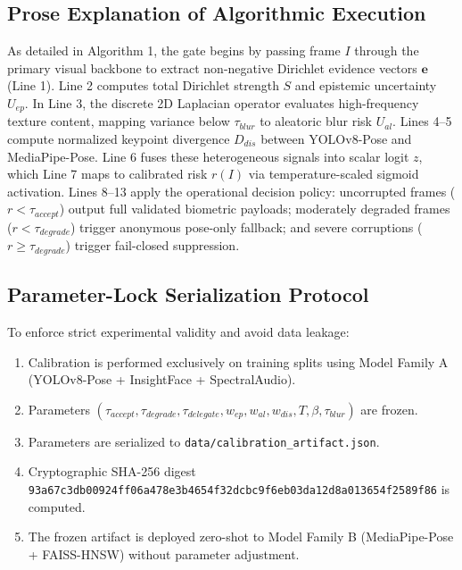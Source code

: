 \documentclass[conference]{IEEEtran}
\begin{document}
\subsection{Prose Explanation of Algorithmic Execution}
As detailed in Algorithm 1, the gate begins by passing frame $I$ through the primary visual backbone to extract non-negative Dirichlet evidence vectors $\mathbf{e}$ (Line 1). Line 2 computes total Dirichlet strength $S$ and epistemic uncertainty $U_{ep}$. In Line 3, the discrete 2D Laplacian operator evaluates high-frequency texture content, mapping variance below $\tau_{blur}$ to aleatoric blur risk $U_{al}$. Lines 4--5 compute normalized keypoint divergence $D_{dis}$ between YOLOv8-Pose and MediaPipe-Pose. Line 6 fuses these heterogeneous signals into scalar logit $z$, which Line 7 maps to calibrated risk $r(I)$ via temperature-scaled sigmoid activation. Lines 8--13 apply the operational decision policy: uncorrupted frames ($r < \tau_{accept}$) output full validated biometric payloads; moderately degraded frames ($r < \tau_{degrade}$) trigger anonymous pose-only fallback; and severe corruptions ($r \ge \tau_{degrade}$) trigger fail-closed suppression.

\subsection{Parameter-Lock Serialization Protocol}
To enforce strict experimental validity and avoid data leakage:
\begin{enumerate}
    \item Calibration is performed exclusively on training splits using Model Family A (YOLOv8-Pose + InsightFace + SpectralAudio).
    \item Parameters $(\tau_{accept}, \tau_{degrade}, \tau_{delegate}, w_{ep}, w_{al}, w_{dis}, T, \beta, \tau_{blur})$ are frozen.
    \item Parameters are serialized to \texttt{data/calibration\_artifact.json}.
    \item Cryptographic SHA-256 digest \texttt{93a67c3db00924ff06a478e3b4654f32dcbc9f6eb03da12d8a013654f2589f86} is computed.
    \item The frozen artifact is deployed zero-shot to Model Family B (MediaPipe-Pose + FAISS-HNSW) without parameter adjustment.
\end{enumerate}
\end{document}
